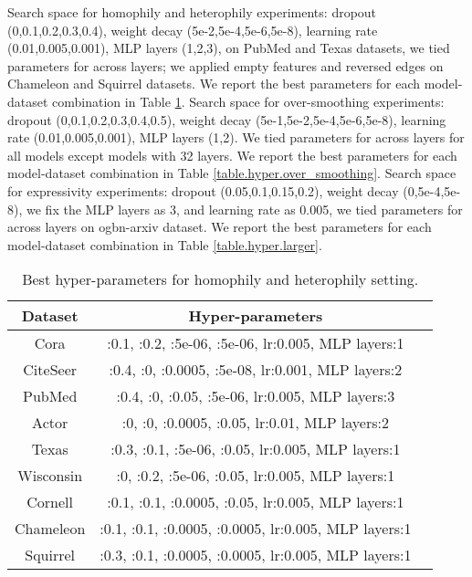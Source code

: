 \documentclass{article}
\begin{document}
Search space for homophily and heterophily experiments: dropout (0,0.1,0.2,0.3,0.4), weight decay (5e-2,5e-4,5e-6,5e-8), learning rate (0.01,0.005,0.001), MLP layers (1,2,3), on PubMed and Texas datasets, we tied parameters for  across layers; we applied empty features \citep{zhu2020graph} and reversed edges on Chameleon and Squirrel datasets. We report the best parameters for each model-dataset combination in Table \ref{table.hyper.hete_homo}. Search space for over-smoothing experiments: dropout (0,0.1,0.2,0.3,0.4,0.5), weight decay (5e-1,5e-2,5e-4,5e-6,5e-8), learning rate (0.01,0.005,0.001), MLP layers (1,2). We tied parameters for  across layers for all models except models with 32 layers. We report the best parameters for each model-dataset combination in Table \ref{table.hyper.over_smoothing}. Search space for expressivity experiments: dropout (0.05,0.1,0.15,0.2), weight decay (0,5e-4,5e-8), we fix the MLP layers as 3, and learning rate as 0.005, we tied parameters for  across layers on ogbn-arxiv dataset. We report the best parameters for each model-dataset combination in Table \ref{table.hyper.larger}.



















\begin{table}
\caption{Best hyper-parameters for homophily and heterophily setting.}
\label{table.hyper.hete_homo}
\centering
\begin{tabular}{c|cc}

\toprule
Dataset & Hyper-parameters\\
\midrule
Cora & :0.1, :0.2, :5e-06, :5e-06, lr:0.005, MLP layers:1\\
\midrule
CiteSeer & :0.4, :0, :0.0005, :5e-08, lr:0.001, MLP layers:2\\
\midrule
PubMed & :0.4, :0, :0.05, :5e-06, lr:0.005, MLP layers:3\\
\midrule
Actor & :0, :0, :0.0005, :0.05, lr:0.01, MLP layers:2\\
\midrule
Texas & :0.3, :0.1, :5e-06, :0.05, lr:0.005, MLP layers:1\\
\midrule
Wisconsin & :0, :0.2, :5e-06, :0.05, lr:0.005, MLP layers:1\\
\midrule
Cornell & :0.1, :0.1, :0.0005, :0.05, lr:0.005, MLP layers:1\\
\midrule
Chameleon & :0.1, :0.1, :0.0005, :0.0005, lr:0.005, MLP layers:1\\
\midrule
Squirrel & :0.3, :0.1, :0.0005, :0.0005, lr:0.005, MLP layers:1\\
\bottomrule

\end{tabular}
\end{table}
\end{document}
